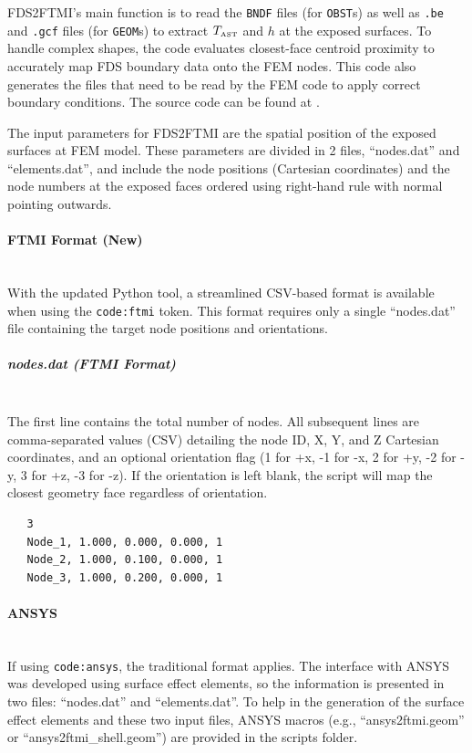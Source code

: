 \documentclass[11pt]{book}
\newcommand{\textct}[1]{\texttt{#1}}
\begin{document}
FDS2FTMI's main function is to read the \textct{BNDF} files (for \textct{OBST}s) as well as \textct{.be} and \textct{.gcf} files (for \textct{GEOM}s) to extract $T_{\hbox{\tiny AST}}$ and $h$ at the exposed surfaces. To handle complex shapes, the code evaluates closest-face centroid proximity to accurately map FDS boundary data onto the FEM nodes. This code also generates the files that need to be read by the FEM code to apply correct boundary conditions. The source code can be found at .

The input parameters for FDS2FTMI are the spatial position of the exposed surfaces at FEM model. These parameters are divided in 2 files, ``nodes.dat'' and ``elements.dat'', and include the node positions (Cartesian coordinates) and the node numbers at the exposed faces ordered using right-hand rule with normal pointing outwards. 

\paragraph{FTMI Format (New)}~\\
With the updated Python tool, a streamlined CSV-based format is available when using the \texttt{code:ftmi} token. This format requires only a single ``nodes.dat'' file containing the target node positions and orientations.

\subparagraph{nodes.dat (FTMI Format)}~\\
The first line contains the total number of nodes. All subsequent lines are comma-separated values (CSV) detailing the node ID, X, Y, and Z Cartesian coordinates, and an optional orientation flag (1 for +x, -1 for -x, 2 for +y, -2 for -y, 3 for +z, -3 for -z). If the orientation is left blank, the script will map the closest geometry face regardless of orientation.
\begin{verbatim}
   3
   Node_1, 1.000, 0.000, 0.000, 1
   Node_2, 1.000, 0.100, 0.000, 1
   Node_3, 1.000, 0.200, 0.000, 1
\end{verbatim}

\paragraph{A{\footnotesize NSYS}}~\\ 
If using \texttt{code:ansys}, the traditional format applies. The interface with A{\footnotesize NSYS} was developed using surface effect elements, so the information is presented in two files: ``nodes.dat'' and ``elements.dat''. To help in the generation of the surface effect elements and these two input files, A{\footnotesize NSYS} macros (e.g., ``ansys2ftmi.geom'' or ``ansys2ftmi\_shell.geom'') are provided in the scripts folder.
\end{document}
